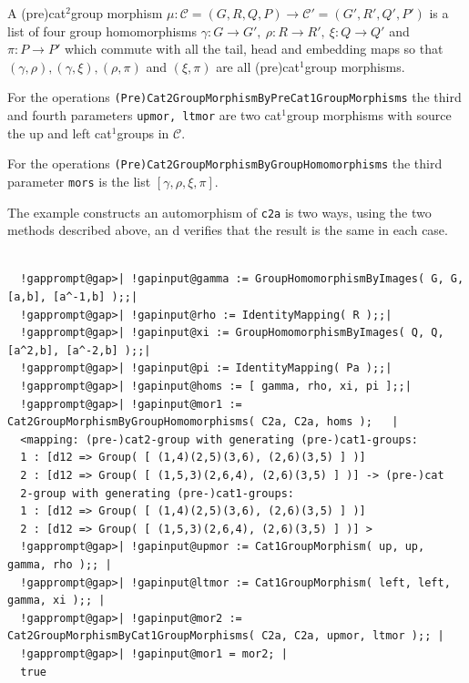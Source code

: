 \documentclass[a4paper,11pt]{report}
\newcommand{\calC}{\mathcal{C}}
\begin{document}
{{{ A (pre\texttt{})cat$^2$\texttt{}group morphism $\mu : \calC = (G,R,Q,P) \to \calC' = (G',R',Q',P')$ is a list of four group homomorphisms $\gamma : G \to G',~ \rho : R \to R',~ \xi : Q \to Q'$ and $\pi : P \to P'$ which commute with all the tail, head and embedding maps so that $(\gamma,\rho), (\gamma,\xi), (\rho,\pi)$ and $(\xi,\pi)$ are all (pre\texttt{})cat$^1$\texttt{}group morphisms. 

 For the operations \texttt{(Pre)Cat2GroupMorphismByPreCat1GroupMorphisms} the third and fourth parameters \texttt{upmor, ltmor} are two cat$^1$\texttt{}group morphisms with source the up and left cat$^1$\texttt{}groups in $\calC$. 

 For the operations \texttt{(Pre)Cat2GroupMorphismByGroupHomomorphisms} the third parameter \texttt{mors} is the list $[\gamma,\rho,\xi,\pi]$. 

 The example constructs an automorphism of \texttt{c2a} is two ways, using the two methods described above, an d verifies that the
result is the same in each case. }

 
\begin{Verbatim}[commandchars=!@|,fontsize=\small,frame=single,label=Example]
  
  !gapprompt@gap>| !gapinput@gamma := GroupHomomorphismByImages( G, G, [a,b], [a^-1,b] );;|
  !gapprompt@gap>| !gapinput@rho := IdentityMapping( R );;|
  !gapprompt@gap>| !gapinput@xi := GroupHomomorphismByImages( Q, Q, [a^2,b], [a^-2,b] );;|
  !gapprompt@gap>| !gapinput@pi := IdentityMapping( Pa );;|
  !gapprompt@gap>| !gapinput@homs := [ gamma, rho, xi, pi ];;|
  !gapprompt@gap>| !gapinput@mor1 := Cat2GroupMorphismByGroupHomomorphisms( C2a, C2a, homs );   |
  <mapping: (pre-)cat2-group with generating (pre-)cat1-groups:
  1 : [d12 => Group( [ (1,4)(2,5)(3,6), (2,6)(3,5) ] )]
  2 : [d12 => Group( [ (1,5,3)(2,6,4), (2,6)(3,5) ] )] -> (pre-)cat
  2-group with generating (pre-)cat1-groups:
  1 : [d12 => Group( [ (1,4)(2,5)(3,6), (2,6)(3,5) ] )]
  2 : [d12 => Group( [ (1,5,3)(2,6,4), (2,6)(3,5) ] )] >
  !gapprompt@gap>| !gapinput@upmor := Cat1GroupMorphism( up, up, gamma, rho );; |
  !gapprompt@gap>| !gapinput@ltmor := Cat1GroupMorphism( left, left, gamma, xi );; |
  !gapprompt@gap>| !gapinput@mor2 := Cat2GroupMorphismByCat1GroupMorphisms( C2a, C2a, upmor, ltmor );; |
  !gapprompt@gap>| !gapinput@mor1 = mor2; |
  true
  
\end{Verbatim}
 

}}
\end{document}
